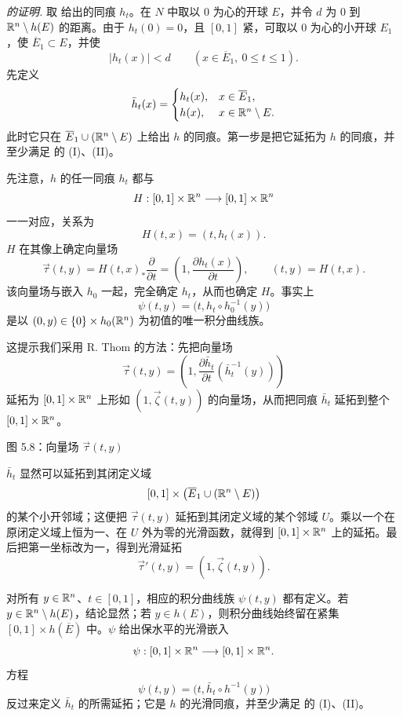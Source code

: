 \par\medskip\noindent\textit{ 的证明.}\quad\label{construction:page61}
取 给出的同痕 $h_t$。在 $N$ 中取以 $0$ 为心的开球 $E$，并令 $d$ 为 $0$ 到 $\mathbb{R}^n\setminus h(E)$ 的距离。由于 $h_t(0)=0$，且 $[0,1]$ 紧，可取以 $0$ 为心的小开球 $E_1$，使 $\overline E_1\subset E$，并使
\[
  |h_t(x)|<d
  \qquad(x\in\overline E_1,\ 0\leq t\leq1).
\]
先定义
\[
  \bar h_t(x)=
  \begin{cases}
    h_t(x),&x\in\overline E_1,\\
    h(x),&x\in\mathbb{R}^n\setminus E.
  \end{cases}
\]
此时它只在 $\overline E_1\cup(\mathbb{R}^n\setminus E)$ 上给出 $h$ 的同痕。第一步是把它延拓为 $h$ 的同痕，并至少满足 的 (I)、(II)。

\label{construction:page62}先注意，$h$ 的任一同痕 $h_t$ 都与
\[
  H:[0,1]\times\mathbb{R}^n\longrightarrow[0,1]\times\mathbb{R}^n
\]
一一对应，关系为
\[
  H(t,x)=(t,h_t(x)).
\]
$H$ 在其像上确定向量场
\[
  \vec\tau(t,y)
  =H(t,x)_*\frac{\partial}{\partial t}
  =\left(1,\frac{\partial h_t(x)}{\partial t}\right),
  \qquad (t,y)=H(t,x).
\]
该向量场与嵌入 $h_0$ 一起，完全确定 $h_t$，从而也确定 $H$。事实上
\[
  \psi(t,y)=\bigl(t,h_t\circ h_0^{-1}(y)\bigr)
\]
是以 $(0,y)\in\{0\}\times h_0(\mathbb{R}^n)$ 为初值的唯一积分曲线族。

这提示我们采用 R. Thom 的方法：先把向量场
\[
  \vec\tau(t,y)
  =\left(1,
    \frac{\partial\bar h_t}{\partial t}
      (\bar h_t^{-1}(y))
   \right)
\]
延拓为 $[0,1]\times\mathbb{R}^n$ 上形如 $(1,\vec\zeta(t,y))$ 的向量场，从而把同痕 $\bar h_t$ 延拓到整个 $[0,1]\times\mathbb{R}^n$。

\begin{center}
  \FigFiveEight

  \label{fig:5.8}图 5.8：向量场 $\vec\tau(t,y)$
\end{center}

$\bar h_t$ 显然可以延拓到其闭定义域
\[
  [0,1]\times\bigl(\overline E_1\cup(\mathbb{R}^n\setminus E)\bigr)
\]
的某个小开邻域；这便把 $\vec\tau(t,y)$ 延拓到其闭定义域的某个邻域 $U$。乘以一个在原闭定义域上恒为一、在 $U$ 外为零的光滑函数，就得到 $[0,1]\times\mathbb{R}^n$ 上的延拓。最后把第一坐标改为一，得到光滑延拓
\[
  \vec\tau'(t,y)=(1,\vec\zeta(t,y)).
\]

对所有 $y\in\mathbb{R}^n$、$t\in[0,1]$，相应的积分曲线族 $\psi(t,y)$ 都有定义。若 $y\in\mathbb{R}^n\setminus h(E)$，结论显然；若 $y\in h(E)$，则积分曲线始终留在紧集 $[0,1]\times h(\overline E)$ 中。$\psi$ 给出保水平的光滑嵌入
\[
  \psi:[0,1]\times\mathbb{R}^n\longrightarrow[0,1]\times\mathbb{R}^n.
\]
方程
\[
  \psi(t,y)=\bigl(t,\bar h_t\circ h^{-1}(y)\bigr)
\]
反过来定义 $\bar h_t$ 的所需延拓；它是 $h$ 的光滑同痕，并至少满足 的 (I)、(II)。

